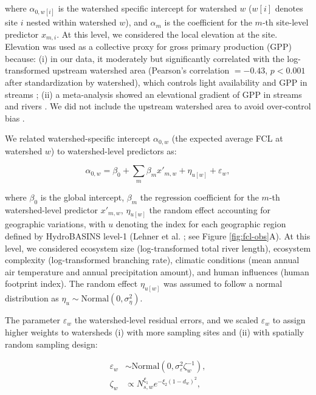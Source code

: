 \documentclass[11pt, class=article, crop=false]{standalone}
\begin{document}
where $\alpha_{0, w[i]}$ is the watershed specific intercept for watershed $w$ ($w[i]$ denotes site $i$ nested within watershed $w$), and $\alpha_m$ is the coefficient for the $m$-th site-level predictor $x_{m, i}$.
At this level, we considered the local elevation at the site. 
Elevation was used as a collective proxy for gross primary production (GPP) because: (i) in our data, it moderately but significantly correlated with the log-transformed upstream watershed area (Pearson's correlation $= -0.43$, $p < 0.001$ after standardization by watershed), which controls light availability and GPP in streams \citep{finlay_light-mediated_2011, finlay_stream_2011, bernhardt_light_2022}; (ii) a meta-analysis showed an elevational gradient of GPP in streams and rivers \citep{marzolf_ecosystem_2021}.
We did not include the upstream watershed area to avoid over-control bias \citep{arif_predictive_2022}.

We related watershed-specific intercept $\alpha_{0, w}$ (the expected average FCL at watershed $w$) to watershed-level predictors as:

\begin{equation}
    \alpha_{0, w} = \beta_0 + \sum_m \beta_m x'_{m, w} + \eta_{u[w]} + \varepsilon_{w},
    \label{eq:watershed-avarage}
\end{equation}

where $\beta_0$ is the global intercept, $\beta_m$ the regression coefficient for the $m$-th watershed-level predictor $x'_{m, w}$, $\eta_{u[w]}$ the random effect accounting for geographic variations, with $u$ denoting the index for each geographic region defined by HydroBASINS level-1 (Lehner et al. \citep{lehner_global_2013}; see Figure \ref{fig:fcl-obs}A).
At this level, we considered ecosystem size (log-transformed total river length), ecosystem complexity (log-transformed branching rate), climatic conditions (mean annual air temperature and annual precipitation amount), and human influences (human footprint index).
The random effect $\eta_{u[w]}$ was assumed to follow a normal distribution as $\eta_{u} \sim \mbox{Normal}(0, \sigma_{\eta}^2)$.

The parameter $\varepsilon_w$ the watershed-level residual errors, and we scaled $\varepsilon_w$ to assign higher weights to watersheds (i) with more sampling sites and (ii) with spatially random sampling design:

\begin{align}
    \varepsilon_w &\sim \mbox{Normal}(0, \sigma_{\varepsilon}^2 \zeta_w^{-1}),\\
    \zeta_w &\propto N_{s, w}^{\xi_1} e^{-\xi_2 (1 - d_{w})^2},
\end{align}
\end{document}
